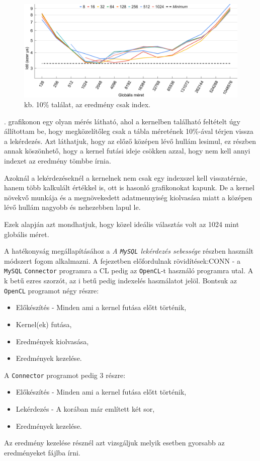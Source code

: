 \begin{figure}[h!]
\centering
\includegraphics[width=\textwidth]{images/graph/global_size_2.png}
\caption{kb. 10\% találat, az eredmény csak index.}
\label{fig:global_size_2}
\end{figure}

. grafikonon egy olyan mérés látható, ahol a kernelben található feltételt úgy állítottam be, hogy megközelítőleg csak a tábla méretének 10\%-ával térjen vissza a lekérdezés.
Azt láthatjuk, hogy az előző középen lévő hullám lesimul, ez részben annak köszönhető, hogy a kernel futási ideje csökken azzal, hogy nem kell annyi indexet az eredmény tömbbe írnia.

Azoknál a lekérdezéseknél a kernelnek nem csak egy indexszel kell visszatérnie, hanem több kalkulált értékkel is, ott is hasonló grafikonokat kapunk. De a kernel növekvő munkája és a megnövekedett adatmennyiség kiolvasása miatt a középen lévő hullám nagyobb és nehezebben lapul le.

Ezek alapján azt mondhatjuk, hogy közel ideális választás volt az 1024 mint globális méret.


A hatékonyság megállapításához a \textit{A \texttt{MySQL} lekérdezés sebessége} részben használt módszert fogom alkalmazni.
A fejezetben előfordulnak rövidítések:\newline CONN - a \texttt{MySQL} \texttt{Connec\-tor} programra a CL pedig az \texttt{OpenCL}-t használó programra utal. 
A k betű ezres szorzót, az i betű pedig indexelés használatot jelöl.
\newline Bontsuk az \texttt{OpenCL} programot négy részre:
\begin{itemize}
\item Előkészítés - Minden ami a kernel futása előtt történik,
\item Kernel(ek) futása,
\item Eredmények kiolvasása,
\item Eredmények kezelése.
\end{itemize}
A \texttt{Connector} programot pedig 3 részre:
\begin{itemize}
\item Előkészítés - Minden ami a kernel futása előtt történik,
\item Lekérdezés - A korában már említett két sor,
\item Eredmények kezelése.
\end{itemize}
Az eredmény kezelése résznél azt vizsgáljuk melyik esetben gyorsabb az eredményeket fájlba írni.

